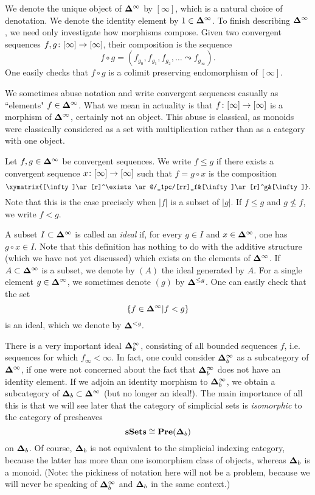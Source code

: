 \documentclass{amsart}
\def\Del{{\bf \Delta}}
\def\Delinf{{\Del^\infty}}
\def\Delb{{\Del_b}}
\begin{document}
We denote the unique object of $\Delinf$ by $[\infty]$, which is a natural choice of denotation.  We denote the identity element by $1\in\Delinf$.  To finish describing $\Delinf$, we need only investigate how morphisms compose.  Given two convergent sequences $f,g\colon[\infty]\rightarrow[\infty]$, their composition is the sequence $$f\circ g=(f_{g_0},f_{g_1},f_{g_2},\ldots\leadsto f_{g_\infty}).$$  One easily checks that $f\circ g$ is a colimit preserving endomorphism of $[\infty]$. 

We sometimes abuse notation and write convergent sequences casually as ``elements" $f\in\Delinf$.  What we mean in actuality is that $f\colon[\infty]\rightarrow[\infty]$ is a morphism of $\Delinf$, certainly not an object.  This abuse is classical, as monoids were classically considered as a set with multiplication rather than as a category with one object.

\begin{definition}

Let $f,g\in\Delinf$ be convergent sequences.  We write $f\leq g$ if there exists a convergent sequence $x\colon[\infty]\rightarrow[\infty]$ such that $f=g\circ x$ is the composition $$\xymatrix{[\infty]\ar[r]^\exists\ar@/_1pc/[rr]_f&[\infty]\ar[r]^g&[\infty]}.$$  Note that this is the case precisely when $|f|$ is a subset of $|g|$.  If $f\leq g$ and $g\not\leq f$, we write $f<g$.

A subset $I\ss\Delinf$ is called an {\em ideal} if, for every $g\in I$ and $x\in\Delinf$, one has $g\circ x\in I$.  Note that this definition has nothing to do with the additive structure (which we have not yet discussed) which exists on the elements of $\Delinf$.  If $A\ss\Delinf$ is a subset, we denote by $(A)$ the ideal generated by $A$.  For a single element $g\in\Delinf$, we sometimes denote $(g)$ by $\Del^{\leq g}$.  One can easily check that the set $$\{f\in\Delinf|f<g\}$$ is an ideal, which we denote by $\Del^{<g}.$

\end{definition}



There is a very important ideal $\Del^\infty_b$, consisting of all bounded sequences $f$, i.e. sequences for which  $f_\infty<\infty.$  In fact, one could consider $\Del^\infty_b$ as a subcategory of $\Delinf$, if one were not concerned about the fact that $\Del^\infty_b$ does not have an identity element.  If we adjoin an identity morphism to $\Del^\infty_b$, we obtain a subcategory of $\Delb\ss\Delinf$ (but no longer an ideal!).  The main importance of all this is that we will see later that the category of simplicial sets is {\em isomorphic} to the category of presheaves $$\sSets\iso\Pre(\Delb)$$ on $\Delb$.  Of course, $\Delb$ is not equivalent to the simplicial indexing category, because the latter has more than one isomorphism class of objects, whereas $\Delb$ is a monoid.  (Note: the pickiness of notation here will not be a problem, because we will never be speaking of $\Del^\infty_b$ and $\Delb$ in the same context.)
\end{document}
